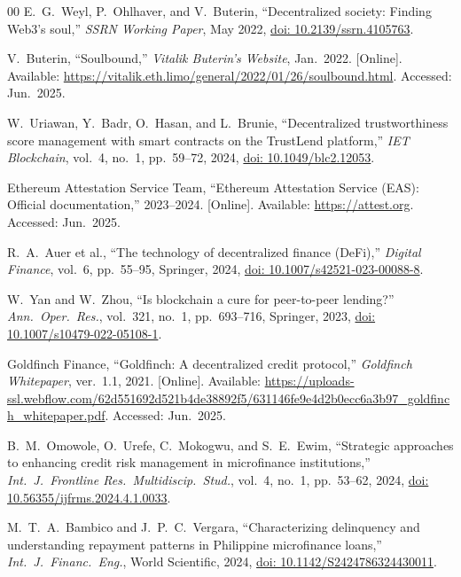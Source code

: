 \documentclass[conference]{IEEEtran}
\begin{document}
\begin{thebibliography}{00}
E.~G.~Weyl, P.~Ohlhaver, and V.~Buterin,
``Decentralized society: Finding Web3's soul,''
\textit{SSRN Working Paper}, May 2022,
\href{https://doi.org/10.2139/ssrn.4105763}{doi: 10.2139/ssrn.4105763}.

V.~Buterin,
``Soulbound,''
\textit{Vitalik Buterin's Website}, Jan.\ 2022. [Online]. Available:
\url{https://vitalik.eth.limo/general/2022/01/26/soulbound.html}.
Accessed: Jun.\ 2025.

W.~Uriawan, Y.~Badr, O.~Hasan, and L.~Brunie,
``Decentralized trustworthiness score management with smart contracts
on the TrustLend platform,''
\textit{IET Blockchain}, vol.~4, no.~1, pp.~59--72, 2024,
\href{https://doi.org/10.1049/blc2.12053}{doi: 10.1049/blc2.12053}.

Ethereum Attestation Service Team,
``Ethereum Attestation Service (EAS): Official documentation,''
2023--2024. [Online]. Available: \url{https://attest.org}.
Accessed: Jun.\ 2025.

R.~A.~Auer et al.,
``The technology of decentralized finance (DeFi),''
\textit{Digital Finance}, vol.~6, pp.~55--95, Springer, 2024,
\href{https://doi.org/10.1007/s42521-023-00088-8}{doi: 10.1007/s42521-023-00088-8}.

W.~Yan and W.~Zhou,
``Is blockchain a cure for peer-to-peer lending?''
\textit{Ann.\ Oper.\ Res.}, vol.~321, no.~1, pp.~693--716, Springer, 2023,
\href{https://doi.org/10.1007/s10479-022-05108-1}{doi: 10.1007/s10479-022-05108-1}.

Goldfinch Finance,
``Goldfinch: A decentralized credit protocol,''
\textit{Goldfinch Whitepaper}, ver.~1.1, 2021. [Online]. Available:
\url{https://uploads-ssl.webflow.com/62d551692d521b4de38892f5/631146fe9e4d2b0ecc6a3b97_goldfinch_whitepaper.pdf}.
Accessed: Jun.\ 2025.

B.~M.~Omowole, O.~Urefe, C.~Mokogwu, and S.~E.~Ewim,
``Strategic approaches to enhancing credit risk management in
microfinance institutions,''
\textit{Int.\ J.\ Frontline Res.\ Multidiscip.\ Stud.}, vol.~4, no.~1,
pp.~53--62, 2024,
\href{https://doi.org/10.56355/ijfrms.2024.4.1.0033}{doi: 10.56355/ijfrms.2024.4.1.0033}.

M.~T.~A.~Bambico and J.~P.~C.~Vergara,
``Characterizing delinquency and understanding repayment patterns
in Philippine microfinance loans,''
\textit{Int.\ J.\ Financ.\ Eng.}, World Scientific, 2024,
\href{https://doi.org/10.1142/S2424786324430011}{doi: 10.1142/S2424786324430011}.


\end{thebibliography}
\end{document}
